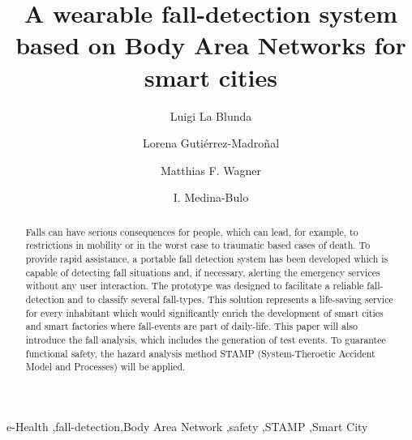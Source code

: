 \documentclass[review]{elsarticle}
\begin{document}
\begin{frontmatter}

\title{A wearable fall-detection system based on Body Area Networks for smart cities}

\author{Luigi La Blunda}
\author{Lorena Guti\'errez-Madro\~nal}
\author{Matthias F. Wagner}
\author{I. Medina-Bulo}
\address[label1]{WSN and IOT Research Group Frankfurt University of Applied Sciences, Nibelungenplatz 1, 60318 Frankfurt am Main, Germany}
\address[label2]{UCASE Software Engineering Research group, University of Cadiz}



%
%

\begin{abstract}
Falls can have serious consequences for people, which can lead, for example, to restrictions in mobility or in the worst case to traumatic based cases of death. To provide rapid assistance, a portable fall detection system has been developed which is capable of detecting fall situations and, if necessary, alerting the emergency services without any user interaction. The prototype was designed to facilitate a reliable fall-detection and to classify several fall-types. This solution represents a life-saving service for every inhabitant which would significantly enrich the development of smart cities and smart factories where fall-events are part of daily-life. This paper will also introduce the fall analysis, which includes the generation of test events. To guarantee functional safety, the hazard analysis method STAMP (System-Theroetic Accident Model and Processes) will be applied. 
\end{abstract}

\begin{keyword}
e-Health \sep fall-detection\sep Body Area Network \sep safety \sep STAMP \sep Smart City \ 
\end{keyword}

\end{frontmatter}
\end{document}
